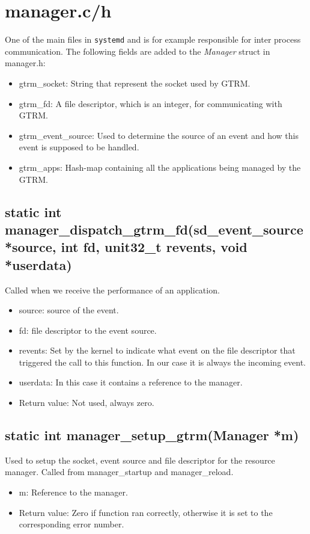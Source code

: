 \documentclass[nobiblatex]{LTHthesis}
\begin{document}
\section{manager.c/h}
One of the main files in \texttt{systemd} and is for example responsible for inter process communication. The following fields are added to the \emph{Manager} struct in manager.h:
\begin{itemize}
\item gtrm\_socket: String that represent the socket used by GTRM.
\item gtrm\_fd: A file descriptor, which is an integer, for communicating with GTRM.
\item gtrm\_event\_source: Used to determine the source of an event and how this event is supposed to be handled.
\item gtrm\_apps: Hash-map containing all the applications being managed by the GTRM.
\end{itemize}

\subsection{static int manager\_dispatch\_gtrm\_fd(sd\_event\_source *source, int fd, unit32\_t revents, void *userdata)}
Called when we receive the performance of an application.
\begin{itemize}
\item source: source of the event.
\item fd: file descriptor to the event source.
\item revents: Set by the kernel to indicate what event on the file descriptor that triggered the call to this function. In our case it is always the incoming event.
\item userdata: In this case it contains a reference to the manager.
\item Return value: Not used, always zero.
\end{itemize}

\subsection{static int manager\_setup\_gtrm(Manager *m)}
Used to setup the socket, event source and file descriptor for the resource manager. Called from manager\_startup and manager\_reload.
\begin{itemize}
\item m: Reference to the manager.
\item Return value: Zero if function ran correctly, otherwise it is set to the corresponding error number.
\end{itemize}
\end{document}

